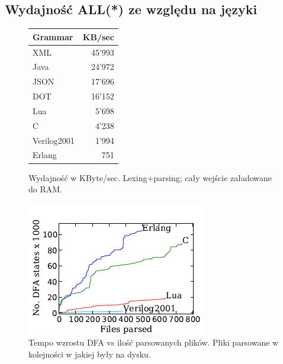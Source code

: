 ﻿\subsection{Wydajność ALL(*) ze względu na języki}
\begin{figure}[h]
\begin{tabular}{|l||r|}
\hline
Grammar & KB/sec \\
\hline\hline
XML & 45'993 \\
Java & 24'972 \\
JSON & 17'696 \\
DOT & 16'152 \\
Lua & 5'698 \\
C & 4'238 \\
Verilog2001 & 1'994 \\
Erlang &751 \\
\hline
\end{tabular}
\caption{Wydajność w
KByte/sec. Lexing+parsing;
cały wejście załadowane do RAM.}
\end{figure}

\begin{figure}[h]
\includegraphics[scale=0.8]{Figure12.png}
\caption{
Tempo wzrostu DFA vs ilość parsowanych plików.
Pliki parsowane w kolejności w jakiej były na dysku.
}
\end{figure}

